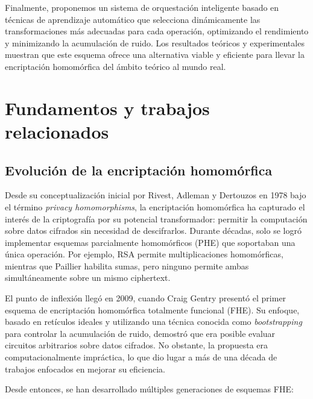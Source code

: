 \documentclass[11pt]{article}
\theoremstyle{plain}
\begin{document}
Finalmente, proponemos un sistema de orquestación inteligente basado en técnicas de aprendizaje automático que selecciona dinámicamente las transformaciones más adecuadas para cada operación, optimizando el rendimiento y minimizando la acumulación de ruido. Los resultados teóricos y experimentales muestran que este esquema ofrece una alternativa viable y eficiente para llevar la encriptación homomórfica del ámbito teórico al mundo real.

\section{Fundamentos y trabajos relacionados}

\subsection{Evolución de la encriptación homomórfica}

Desde su conceptualización inicial por Rivest, Adleman y Dertouzos en 1978 bajo el término \textit{privacy homomorphisms}, la encriptación homomórfica ha capturado el interés de la criptografía por su potencial transformador: permitir la computación sobre datos cifrados sin necesidad de descifrarlos. Durante décadas, solo se logró implementar esquemas parcialmente homomórficos (PHE) que soportaban una única operación. Por ejemplo, RSA permite multiplicaciones homomórficas, mientras que Paillier habilita sumas, pero ninguno permite ambas simultáneamente sobre un mismo ciphertext.

El punto de inflexión llegó en 2009, cuando Craig Gentry presentó el primer esquema de encriptación homomórfica totalmente funcional (FHE). Su enfoque, basado en retículos ideales y utilizando una técnica conocida como \textit{bootstrapping} para controlar la acumulación de ruido, demostró que era posible evaluar circuitos arbitrarios sobre datos cifrados. No obstante, la propuesta era computacionalmente impráctica, lo que dio lugar a más de una década de trabajos enfocados en mejorar su eficiencia.

Desde entonces, se han desarrollado múltiples generaciones de esquemas FHE:
\end{document}
